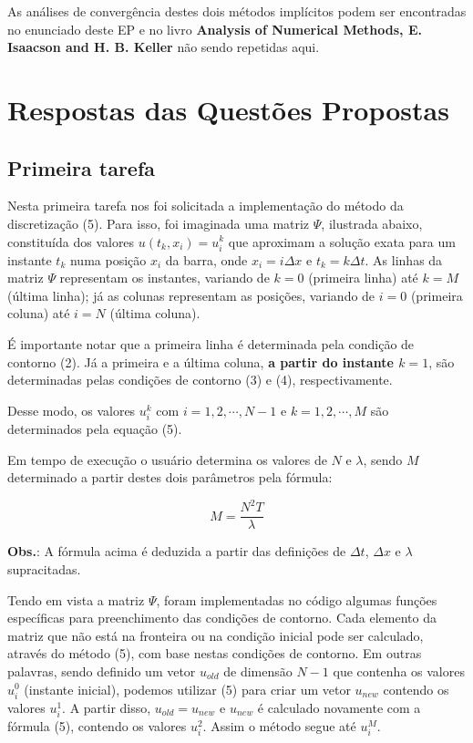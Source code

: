 \documentclass[a4paper, 12pt]{article}
\begin{document}
As análises de convergência destes dois métodos implícitos podem ser encontradas no enunciado deste EP e no livro \textbf{Analysis of Numerical Methods, E. Isaacson and H. B. Keller} não sendo repetidas aqui.


\section{Respostas das Questões Propostas}

\subsection{Primeira tarefa}

Nesta primeira tarefa nos foi solicitada a implementação do método da discretização (5). Para isso, foi imaginada uma matriz $\Psi$, ilustrada abaixo, constituída dos valores $u(t_k, x_i)=u_i^k$ que aproximam a solução exata para um instante $t_k$ numa posição $x_i$ da barra, onde $x_i = i \Delta x$ e $t_k = k \Delta t$. As linhas da matriz $\Psi$ representam os instantes, variando de $k=0$ (primeira linha) até $k=M$ (última linha); já as colunas representam as posições, variando de $i=0$ (primeira coluna) até $i=N$ (última coluna). 

É importante notar que a primeira linha é determinada pela condição de contorno (2). Já a primeira e a última coluna, \textbf{a partir do instante $k=1$}, são determinadas pelas condições de contorno (3) e (4), respectivamente. 

Desse modo, os valores $u_i^k$ com $i=1, 2,\cdots, N-1$ e $k=1,2,\cdots, M$ são determinados pela equação (5).

Em tempo de execução o usuário determina os valores de $N$ e $\lambda$, sendo $M$ determinado a partir destes dois parâmetros pela fórmula:

$$M=\frac{N^{2}T}{\lambda}$$

\textbf{Obs.}: A fórmula acima é deduzida a partir das definições de $\Delta t$, $\Delta x$ e $\lambda$ supracitadas.

Tendo em vista a matriz $\Psi$, foram implementadas no código algumas funções específicas para preenchimento das condições de contorno. Cada elemento da matriz que não está na fronteira ou na condição inicial pode ser calculado, através do método (5), com base nestas condições de contorno. Em outras palavras, sendo definido um vetor $u_{old}$ de dimensão $N-1$ que contenha os valores $u_i^0$ (instante inicial), podemos utilizar (5) para criar um vetor $u_{new}$ contendo os valores $u_{i}^{1}$. A partir disso, $u_{old} = u_{new}$ e $u_{new}$ é calculado novamente com a fórmula (5), contendo os valores  $u_i^2$. Assim o método segue até $u_i^M$.
\end{document}
